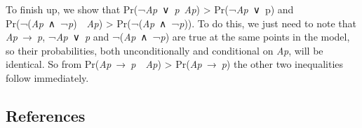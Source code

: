 \documentclass[
  11pt,
  letterpaper,
  DIV=11,
  numbers=noendperiod,
  twoside]{scrartcl}
\begin{document}
To finish up, we show that Pr(¬\emph{Ap}~∨~\emph{p}\textbar~\emph{Ap})
\textgreater{} Pr(¬\emph{Ap}~∨~p) and
Pr(¬(\emph{Ap}~∧~¬\emph{p})~\textbar~\emph{Ap}) \textgreater{}
Pr(¬(\emph{Ap}~∧~¬\emph{p})). To do this, we just need to note that
\emph{Ap}~→~\emph{p}, ¬\emph{Ap}~∨~\emph{p} and ¬(\emph{Ap}~∧~¬\emph{p})
are true at the same points in the model, so their probabilities, both
unconditionally and conditional on \emph{Ap}, will be identical. So from
Pr(\emph{Ap}~→~\emph{p}~\textbar~\emph{Ap}) \textgreater{}
Pr(\emph{Ap}~→~\emph{p}) the other two inequalities follow immediately.

\subsection*{References}\label{references}
\end{document}
